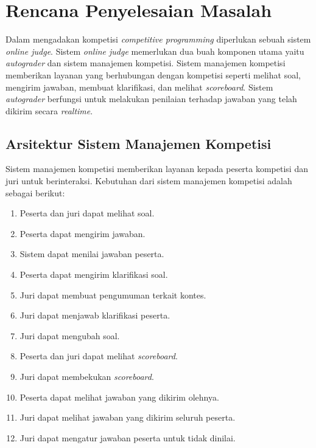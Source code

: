 \chapter{Rencana Penyelesaian Masalah}

\par Dalam mengadakan kompetisi \textit{competitive programming} diperlukan sebuah sistem \textit{online judge}. Sistem \textit{online judge} memerlukan dua buah komponen utama yaitu \textit{autograder} dan sistem manajemen kompetisi. Sistem manajemen kompetisi memberikan layanan yang berhubungan dengan kompetisi seperti melihat soal, mengirim jawaban, membuat klarifikasi, dan melihat \textit{scoreboard}. Sistem \textit{autograder} berfungsi untuk melakukan penilaian terhadap jawaban yang telah dikirim secara \textit{realtime}.

\section{Arsitektur Sistem Manajemen Kompetisi}

\par Sistem manajemen kompetisi memberikan layanan kepada peserta kompetisi dan juri untuk berinteraksi. Kebutuhan dari sistem manajemen kompetisi adalah sebagai berikut:

\begin{enumerate}
    \item Peserta dan juri dapat melihat soal.
    \item Peserta dapat mengirim jawaban.
    \item Sistem dapat menilai jawaban peserta.
    \item Peserta dapat mengirim klarifikasi soal.
    \item Juri dapat membuat pengumuman terkait kontes.
    \item Juri dapat menjawab klarifikasi peserta.
    \item Juri dapat mengubah soal.
    \item Peserta dan juri dapat melihat \textit{scoreboard}.
    \item Juri dapat membekukan \textit{scoreboard}.
    \item Peserta dapat melihat jawaban yang dikirim olehnya.
    \item Juri dapat melihat jawaban yang dikirim seluruh peserta.
    \item Juri dapat mengatur jawaban peserta untuk tidak dinilai.
\end{enumerate}

